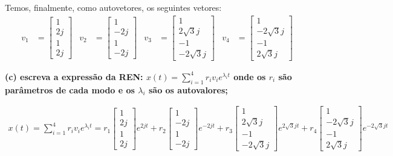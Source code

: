 \documentclass[11pt]{article}
\begin{document}
Temos, finalmente, como autovetores, os seguintes vetores:
\begin{align*}
  v_1 &=
  \begin{bmatrix}
    1\\
    2j\\
    1\\
    2j
  \end{bmatrix}
  &
  v_2 &=
  \begin{bmatrix}
    1\\
    -2j\\
    1\\
    -2j
  \end{bmatrix}
  &
  v_3 &=
  \begin{bmatrix}
    1\\
    2\sqrt{3}j\\
    -1\\
    -2\sqrt{3}j
  \end{bmatrix}
  &
  v_4 &=
  \begin{bmatrix}
    1\\
    -2\sqrt{3}j\\
    -1\\
    2\sqrt{3}j
  \end{bmatrix}
\end{align*}

\textbf{(c) escreva a expressão da REN: $x(t) = \sum_{i=1}^{4} r_i v_i e^{\lambda_i t}$ onde os $r_i$ são parâmetros de cada modo e os $\lambda_i$ são os autovalores;}

\begin{align*}
  x(t) = \sum_{i=1}^{4} r_i v_i e^{\lambda_i t} =
  r_1
  \begin{bmatrix}
    1\\
    2j\\
    1\\
    2j
  \end{bmatrix}
  e^{2j t} +
  r_2
  \begin{bmatrix}
    1\\
    -2j\\
    1\\
    -2j
  \end{bmatrix}
  e^{-2j t} +
  r_3
  \begin{bmatrix}
    1\\
    2\sqrt{3}j\\
    -1\\
    -2\sqrt{3}j
  \end{bmatrix}
  e^{2\sqrt{3}j t} +
  r_4
  \begin{bmatrix}
    1\\
    -2\sqrt{3}j\\
    -1\\
    2\sqrt{3}j
  \end{bmatrix}
  e^{-2\sqrt{3}j t}
\end{align*}
\end{document}
